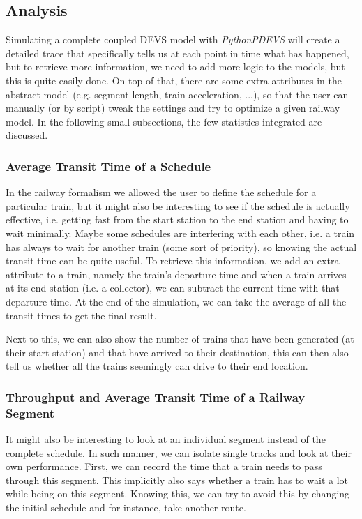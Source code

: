 \documentclass{article}
\begin{document}
\subsection{Analysis}

Simulating a complete coupled DEVS model with \textit{PythonPDEVS} will create a detailed trace that specifically tells us at each point in time what has happened, but to retrieve more information, we need to add more logic to the models, but this is quite easily done. On top of that, there are some extra attributes in the abstract model (e.g. segment length, train acceleration, ...), so that the user can manually (or by script) tweak the settings and try to optimize a given railway model. In the following small subsections, the few statistics integrated are discussed.

\subsubsection{Average Transit Time of a Schedule}

In the railway formalism we allowed the user to define the schedule for a particular train, but it might also be interesting to see if the schedule is actually effective, i.e. getting fast from the start station to the end station and having to wait minimally. Maybe some schedules are interfering with each other, i.e. a train has always to wait for another train (some sort of priority), so knowing the actual transit time can be quite useful. To retrieve this information, we add an extra attribute to a train, namely the train's departure time and when a train arrives at its end station (i.e. a collector), we can subtract the current time with that departure time. At the end of the simulation, we can take the average of all the transit times to get the final result.

Next to this, we can also show the number of trains that have been generated (at their start station) and that have arrived to their destination, this can then also tell us whether all the trains seemingly can drive to their end location.

\subsubsection{Throughput and Average Transit Time of a Railway Segment}

It might also be interesting to look at an individual segment instead of the complete schedule. In such manner, we can isolate single tracks and look at their own performance. First, we can record the time that a train needs to pass through this segment. This implicitly also says whether a train has to wait a lot while being on this segment. Knowing this, we can try to avoid this by changing the initial schedule and for instance, take another route.
\end{document}
